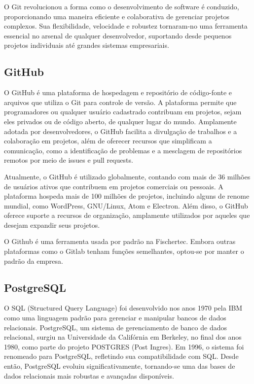 O Git revolucionou a forma como o desenvolvimento de software é conduzido, proporcionando uma maneira eficiente e colaborativa de gerenciar projetos complexos. Sua flexibilidade, velocidade e robustez tornaram-no uma ferramenta essencial no arsenal de qualquer desenvolvedor, suportando desde pequenos projetos individuais até grandes sistemas empresariais.

\subsection{GitHub}

O GitHub é uma plataforma de hospedagem e repositório de código-fonte e arquivos que utiliza o Git para controle de versão. A plataforma permite que programadores ou qualquer usuário cadastrado contribuam em projetos, sejam eles privados ou de código aberto, de qualquer lugar do mundo. Amplamente adotada por desenvolvedores, o GitHub facilita a divulgação de trabalhos e a colaboração em projetos, além de oferecer recursos que simplificam a comunicação, como a identificação de problemas e a mesclagem de repositórios remotos por meio de issues e pull requests.

Atualmente, o GitHub é utilizado globalmente, contando com mais de 36 milhões de usuários ativos que contribuem em projetos comerciais ou pessoais. A plataforma hospeda mais de 100 milhões de projetos, incluindo alguns de renome mundial, como WordPress, GNU/Linux, Atom e Electron. Além disso, o GitHub oferece suporte a recursos de organização, amplamente utilizados por aqueles que desejam expandir seus projetos.

O Github é uma ferramenta usada por padrão na Fischertec. Embora outras plataformas como o Gitlab tenham funções semelhantes, optou-se por manter o padrão da empresa.

\subsection{PostgreSQL}

O SQL (Structured Query Language) foi desenvolvido nos anos 1970 pela IBM como uma linguagem padrão para gerenciar e manipular bancos de dados relacionais. PostgreSQL, um sistema de gerenciamento de banco de dados relacional, surgiu na Universidade da Califórnia em Berkeley, no final dos anos 1980, como parte do projeto POSTGRES (Post Ingres). Em 1996, o sistema foi renomeado para PostgreSQL, refletindo sua compatibilidade com SQL. Desde então, PostgreSQL evoluiu significativamente, tornando-se uma das bases de dados relacionais mais robustas e avançadas disponíveis.

